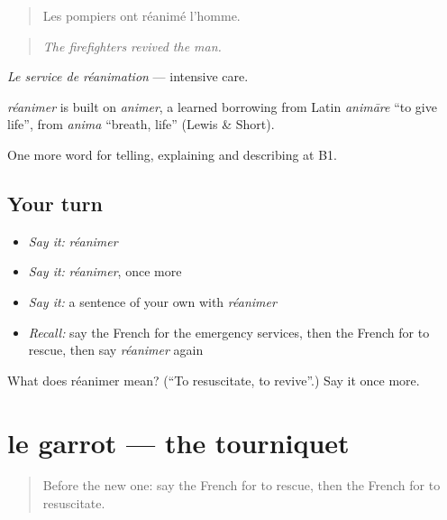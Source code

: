 \begin{quote}
Les pompiers ont réanimé l'homme.
\end{quote}

\begin{quote}
\emph{The firefighters revived the man.}
\end{quote}

\emph{Le service de réanimation} — intensive care.

\begin{cousinweb}
\emph{réanimer} is built on \emph{animer}, a learned borrowing from Latin \emph{animāre} \textquotedblleft{}to give life\textquotedblright{}, from \emph{anima} \textquotedblleft{}breath, life\textquotedblright{} (Lewis \& Short).
\end{cousinweb}

\begin{grammarlens}[title={What you've built}]
One more word for telling, explaining and describing at B1.
\end{grammarlens}

\subsection*{Your turn}
\begin{itemize}
\raggedright
  \item \emph{Say it:} \emph{réanimer}
  \item \emph{Say it:} \emph{réanimer}, once more
  \item \emph{Say it:} a sentence of your own with \emph{réanimer}
  \item \emph{Recall:} say the French for the emergency services, then the French for to rescue, then say \emph{réanimer} again
\end{itemize}

\begin{tcolorbox}[breakable,colback=teal!4,colframe=teal!35!black,title={Before you move on}]
What does réanimer mean? (\textquotedblleft{}To resuscitate, to revive\textquotedblright{}.) Say it once more.
\end{tcolorbox}
\section[le garrot]{le garrot — the tourniquet}

\label{lesson:FR-C300-garrot}



\begin{quote}
Before the new one: say the French for to rescue, then the French for to resuscitate.
\end{quote}

